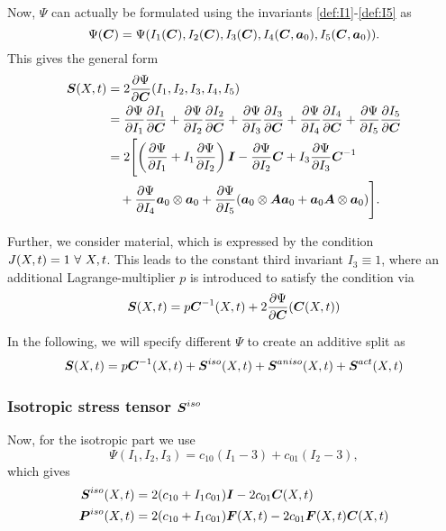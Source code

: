 Now, $\Psi$ can actually be formulated using the invariants \eqref{def:I1}-\eqref{def:I5} as
\[
	\Psi(\vC) = \Psi(I_1(\vC),I_2(\vC),I_3(\vC),I_4(\vC,\va_0),I_5(\vC,\va_0)).
\]
This gives the general form
\begin{align}
	\vS(X,t) &= 2\d{\Psi}{\vC}(I_1,I_2,I_3,I_4,I_5)\\
		&= \d{\Psi}{I_1}\d{I_1}{\vC} + \d{\Psi}{I_2}\d{I_2}{\vC} + \d{\Psi}{I_3}\d{I_3}{\vC} + \d{\Psi}{I_4}\d{I_4}{\vC} + \d{\Psi}{I_5}\d{I_5}{\vC}\\
		&= 2\Biggl[\left(\d{\Psi}{I_1} + I_1\d{\Psi}{I_2}\right)\vI - \d{\Psi}{I_2}\vC + I_3\d{\Psi}{I_3}\vC^{-1}\\
		&\quad+ \d{\Psi}{I_4}\va_0\otimes\va_0 + \d{\Psi}{I_5}(\va_0\otimes\vA\va_0 + \va_0\vA\otimes\va_0)\Biggr].
\end{align}

Further, we consider  material, which is expressed by the condition $J(X,t) = 1 \fo X,t$.
This leads to the constant third invariant $I_3 \equiv 1$, where an additional Lagrange-multiplier $p$ is introduced
to satisfy the condition via
\begin{align}
	\vS(X,t) = p\vC^{-1}(X,t) + 2\d{\Psi}{\vC}(\vC(X,t))
\end{align}

In the following, we will specify different $\Psi$ to create an additive split as 
\begin{align}
	\vS(X,t) = p\vC^{-1}(X,t) + \vSi(X,t) + \vSa(X,t) + \vSf(X,t)\label{def:S_split}
\end{align}

\subsubsection{Isotropic stress tensor $\vSi$}
Now, for the isotropic part we use
\[
	\Psi(I_1,I_2,I_3) = c_{10}(I_1-3) + c_{01}(I_2-3),
\]
which gives
\begin{align}
	\vSi(X,t) &= 2(c_{10} + I_1c_{01})\vI - 2c_{01}\vC(X,t)\\
	\vPi(X,t) &= 2(c_{10} + I_1c_{01})\vF(X,t) - 2c_{01}\vF(X,t)\vC(X,t)
\end{align}


